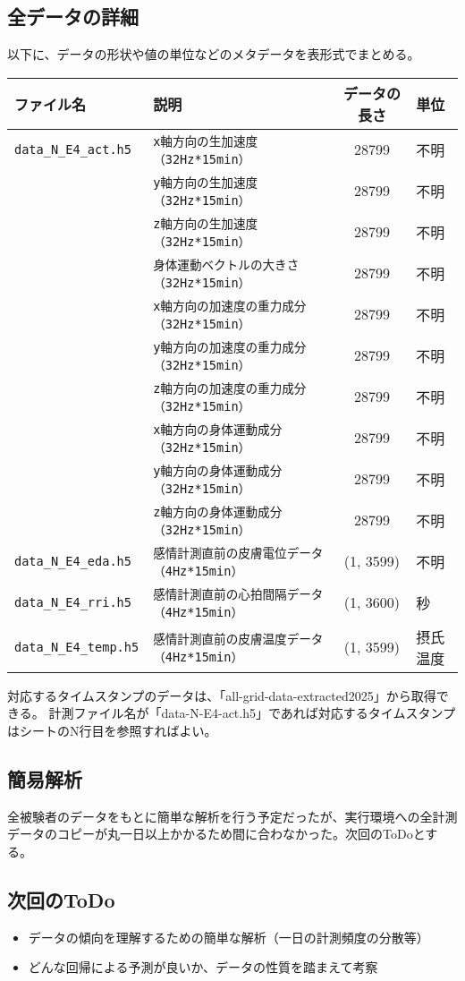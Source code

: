 \documentclass[a4paper,11pt]{article}
\begin{document}
\subsection*{全データの詳細}
以下に、データの形状や値の単位などのメタデータを表形式でまとめる。
\begin{table}[ht]
  \centering
  \begin{tabular}{|l|l|c|l|}
    \hline
    \textbf{ファイル名} & \textbf{説明} & \textbf{データの長さ} & \textbf{単位} \\ \hline
    \texttt{data\_N\_E4\_act.h5} & \texttt{x軸方向の生加速度（32Hz*15min）} & 28799 & 不明 \\ \hline
    \texttt{} & \texttt{y軸方向の生加速度（32Hz*15min）} & 28799 & 不明 \\ \hline
    \texttt{} & \texttt{z軸方向の生加速度（32Hz*15min）} & 28799 & 不明 \\ \hline
    \texttt{} & \texttt{身体運動ベクトルの大きさ（32Hz*15min）} & 28799 & 不明 \\ \hline
    \texttt{} & \texttt{x軸方向の加速度の重力成分（32Hz*15min）} & 28799 & 不明 \\ \hline
    \texttt{} & \texttt{y軸方向の加速度の重力成分（32Hz*15min）} & 28799 & 不明 \\ \hline
    \texttt{} & \texttt{z軸方向の加速度の重力成分（32Hz*15min）} & 28799 & 不明 \\ \hline
    \texttt{} & \texttt{x軸方向の身体運動成分（32Hz*15min）} & 28799 & 不明 \\ \hline
    \texttt{} & \texttt{y軸方向の身体運動成分（32Hz*15min）} & 28799 & 不明 \\ \hline
    \texttt{} & \texttt{z軸方向の身体運動成分（32Hz*15min）} & 28799 & 不明 \\ \hline

    \texttt{data\_N\_E4\_eda.h5} & \texttt{感情計測直前の皮膚電位データ（4Hz*15min）} & (1, 3599)   & 不明 \\ \hline
    \texttt{data\_N\_E4\_rri.h5} & \texttt{感情計測直前の心拍間隔データ（4Hz*15min）} & (1, 3600)   & 秒 \\ \hline
    \texttt{data\_N\_E4\_temp.h5} & \texttt{感情計測直前の皮膚温度データ（4Hz*15min）} & (1, 3599)   & 摂氏温度 \\ \hline
  \end{tabular}
\end{table}


対応するタイムスタンプのデータは、「all-grid-data-extracted2025」から取得できる。
計測ファイル名が「data-N-E4-act.h5」であれば対応するタイムスタンプはシートのN行目を参照すればよい。

\subsection*{簡易解析}
全被験者のデータをもとに簡単な解析を行う予定だったが、実行環境への全計測データのコピーが丸一日以上かかるため間に合わなかった。次回のToDoとする。

\subsection*{次回のToDo}
\begin{itemize}
  \item データの傾向を理解するための簡単な解析（一日の計測頻度の分散等）
  \item どんな回帰による予測が良いか、データの性質を踏まえて考察
\end{itemize}
\end{document}
